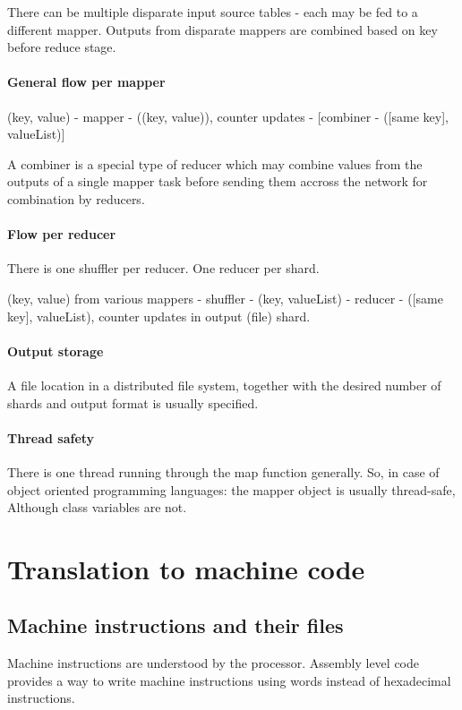 \documentclass[oneside, article]{memoir}
\begin{document}
There can be multiple disparate input source tables - each may be fed to a different mapper. Outputs from disparate mappers are combined based on key before reduce stage.

\subsubsection{General flow per mapper}
(key, value) - mapper - ((key, value)), counter updates - [combiner - ([same key], valueList)]

A combiner is a special type of reducer which may combine values from the outputs of a single mapper task before sending them accross the network for combination by reducers.

\subsubsection{Flow per reducer}
There is one shuffler per reducer. One reducer per shard.

(key, value) from various mappers - shuffler - (key, valueList) - reducer - ([same key], valueList), counter updates in output (file) shard.

\subsubsection{Output storage}
A file location in a distributed file system, together with the desired number of shards and output format is usually specified.

\subsubsection{Thread safety}
There is one thread running through the map function generally. So, in case of object oriented programming languages: the mapper object is usually thread-safe, Although class variables are not.

\tbc

\chapter{Translation to machine code}
\section{Machine instructions and their files}
Machine instructions are understood by the processor. Assembly level code provides a way to write machine instructions using words instead of hexadecimal instructions.
\end{document}
